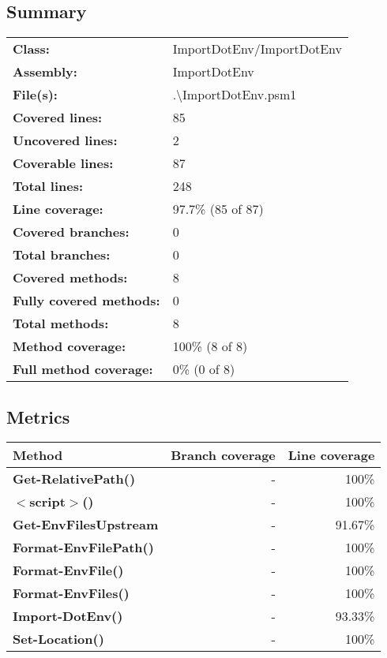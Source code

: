 \documentclass[a4paper,landscape,10pt]{article}
\begin{document}
\subsection{Summary}
\begin{longtable}[l]{ll}
\textbf{Class:} & ImportDotEnv/ImportDotEnv\\
\textbf{Assembly:} & ImportDotEnv\\
\textbf{File(s):} & \begin{minipage}[t]{12cm}{.\textbackslash ImportDotEnv.psm1}\end{minipage} \\
\textbf{Covered lines:} & 85\\
\textbf{Uncovered lines:} & 2\\
\textbf{Coverable lines:} & 87\\
\textbf{Total lines:} & 248\\
\textbf{Line coverage:} & 97.7\% (85 of 87)\\
\textbf{Covered branches:} & 0\\
\textbf{Total branches:} & 0\\
\textbf{Covered methods:} & 8\\
\textbf{Fully covered methods:} & 0\\
\textbf{Total methods:} & 8\\
\textbf{Method coverage:} & 100\% (8 of 8)\\
\textbf{Full method coverage:} & 0\% (0 of 8)\\
\end{longtable}
\subsection{Metrics}
\begin{longtable}[l]{|l|r|r|}
\hline
\textbf{Method} & \textbf{Branch coverage} & \textbf{Line coverage}\\
\hline
\textbf{Get-RelativePath()} & - & 100\%\\
\hline
\textbf{$<$script$>$()} & - & 100\%\\
\hline
\textbf{Get-EnvFilesUpstream} & - & 91.67\%\\
\hline
\textbf{Format-EnvFilePath()} & - & 100\%\\
\hline
\textbf{Format-EnvFile()} & - & 100\%\\
\hline
\textbf{Format-EnvFiles()} & - & 100\%\\
\hline
\textbf{Import-DotEnv()} & - & 93.33\%\\
\hline
\textbf{Set-Location()} & - & 100\%\\
\hline
\end{longtable}
\end{document}
